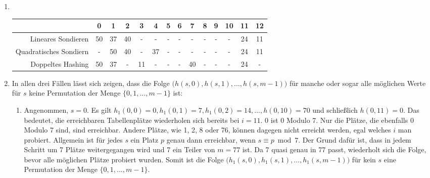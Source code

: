 \documentclass[11pt,a4paper]{article}
\begin{document}
\begin{loesung}
\begin{enumerate}
\begin{table}[h!]
\begin{tabular}{ccccccccccc}
            \end{tabular}
        \end{table}
        \FloatBarrier
        \item \ \\
        \begin{table}[h!]
            \centering
            \begin{tabular}{r|c|c|c|c|c|c|c|c|c|c|c|c|c|}
            \cline{2-14}
            & \textbf{0} & \textbf{1} & \textbf{2} & \textbf{3} & \textbf{4} & \textbf{5} & \textbf{6} & \textbf{7} & \textbf{8} & \textbf{9} & \textbf{10} & \textbf{11} & \textbf{12} \\ \hline
            \multicolumn{1}{|r|}{Lineares Sondieren} & 50 & 37 & 40 & - & - & - & - & - & - & - & - & 24 & 11 \\ \hline
            \multicolumn{1}{|r|}{Quadratisches Sondiern} & - & 50 & 40 & - & 37 & - & - & - & - & - & - & 24 & 11 \\ \hline
            \multicolumn{1}{|r|}{Doppeltes Hashing} & 50 & 37 & - & 11 & - & - & - & 40 & - & - & - & 24 & - \\ \hline
            \end{tabular}
        \end{table}
        \FloatBarrier
        \item 
        In allen drei Fällen lässt sich zeigen, dass die Folge $\big(h(s, 0), h(s, 1), \ldots, h(s, m - 1)\big)$ für manche oder sogar alle möglichen Werte für $s$ keine Permutation der Menge $\{0, 1, \ldots, m - 1\}$ ist:
        \begin{enumerate}[label=\roman*)]
            \item \label{addressing}Angenommen, $s = 0$.
            Es gilt $h_1(0, 0) = 0, h_1(0, 1) = 7, h_1(0, 2) = 14, \ldots, h(0, 10) = 70$ und schließlich $h(0, 11) = 0$.
            Das bedeutet, die erreichbaren Tabellenplätze wiederholen sich bereits bei $i = 11$.
            0 ist 0 Modulo 7.
            Nur die Plätze, die ebenfalls 0 Modulo 7 sind, sind erreichbar.
            Andere Plätze, wie 1, 2, 8 oder 76, können dagegen nicht erreicht werden, egal welches $i$ man probiert.
            Allgemein ist für jedes $s$ ein Platz $p$ genau dann erreichbar, wenn $s \equiv p \bmod 7$.
            Der Grund dafür ist, dass in jedem Schritt um 7 Plätze weitergegangen wird und 7 ein Teiler von $m = 77$ ist.
            Da 7 quasi genau in 77 passt, wiederholt sich die Folge, bevor alle möglichen Plätze probiert wurden.
            Somit ist die Folge $\big(h_1(s, 0), h_1(s, 1), \ldots, h_1(s, m - 1)\big)$ für kein $s$ eine Permutation der Menge $\{0, 1, \ldots, m - 1\}$.


\end{enumerate}
\end{enumerate}
\end{loesung}
\end{document}
